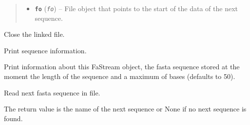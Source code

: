 \documentclass[letterpaper,10pt,english]{sphinxmanual}
\begin{document}
\begin{fulllineitems}
\begin{quote}
\begin{description}
\begin{itemize}
\item {} 
\textbf{\texttt{fo}} (\emph{\texttt{fo}}) -- File object that points to the start of the data of
the next sequence.

\end{itemize}

\end{description}\end{quote}

\begin{fulllineitems}
\label{fasta:libPoMo.fasta.FaStream.close}
Close the linked file.

\end{fulllineitems}


\begin{fulllineitems}
\label{fasta:libPoMo.fasta.FaStream.print_info}
Print sequence information.

Print information about this FaStream object, the fasta
sequence stored at the moment the length of the sequence and a
maximum of  bases (defaults to 50).

\end{fulllineitems}


\begin{fulllineitems}
\label{fasta:libPoMo.fasta.FaStream.read_next_seq}
Read next fasta sequence in file.

The return value is the name of the next sequence or None if
no next sequence is found.

\end{fulllineitems}


\end{fulllineitems}

\end{document}
